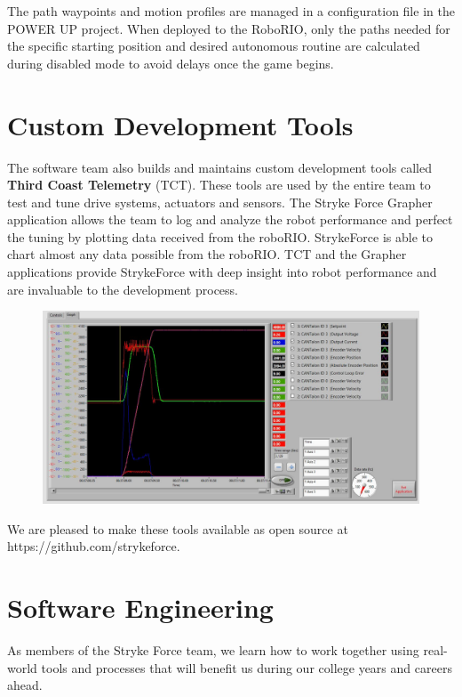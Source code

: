\documentclass[10pt,tumble]{leaflet}
\begin{document}
The path waypoints and motion profiles are managed in a configuration file in the POWER UP project.  When deployed to the RoboRIO, only the paths needed for the specific starting position and desired autonomous routine are calculated during disabled mode to avoid delays once the game begins.

\clearpage

\section{Custom Development Tools}

The software team also builds and maintains custom development tools called \textbf{Third Coast Telemetry} (TCT).  These tools are used by the entire team to test and tune drive systems, actuators and sensors. The Stryke Force Grapher application allows the team to log and analyze the robot performance and perfect the tuning by plotting data received from the roboRIO.  StrykeForce is able to chart almost any data possible from the roboRIO.  TCT and the Grapher applications provide StrykeForce with deep insight into robot performance and are invaluable to the development process.

\begin{figure}[H]
 \centering
 \includegraphics[scale=0.2]{assets/grapher}
\end{figure}

We are pleased to make these tools available as open source at https://github.com/strykeforce.

\section{Software Engineering}

As members of the Stryke Force team, we learn how to work together using real-world tools and processes that will benefit us during our college years and careers ahead.
\end{document}
